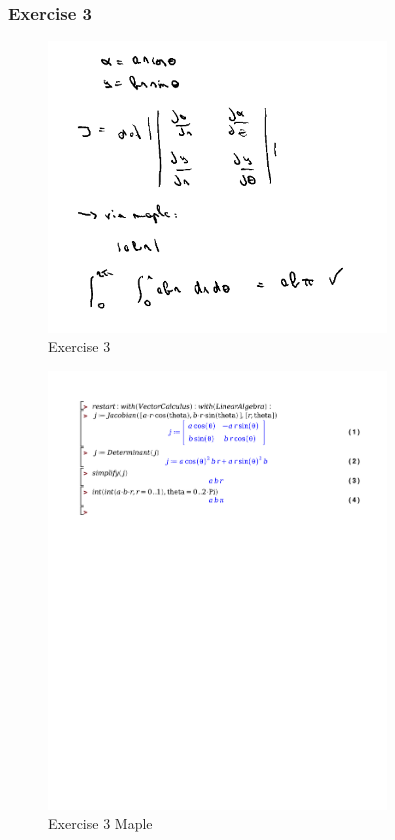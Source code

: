 \documentclass[a4paper]{report}
\begin{document}
\subsubsection{Exercise 3}

\begin{figure}[H]
	\centering
	\includegraphics[width=0.8\textwidth]{assets/wc_5_ex_3.png}
	\caption{Exercise 3}
	\label{fig:wc_5_ex_3}
\end{figure}

\begin{figure}[H]
	\centering
	\includegraphics[width=0.8\textwidth]{exercises/wc_5_ex_3.pdf}
	\caption{Exercise 3 Maple}
	\label{fig:wc_5_ex_3_maple}
\end{figure}
\end{document}
